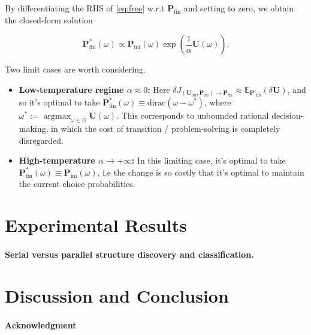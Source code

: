 \documentclass{article} %
\DeclareMathOperator{\argmax}{argmax}
\def\U{\mathbf{U}}
\def\P{\mathbf{P}}
\begin{document}
By differentiating the RHS of \eqref{eq:free} w.r.t $\P_{\text{fin}}$ and setting to zero, we obtain the closed-form solution

\begin{equation}
  \P^*_{\text{fin}}(\omega) \propto \P_{\text{ini}}(\omega)\exp\left(\frac{1}{\alpha}\U(\omega)\right).
\end{equation}

Two limit cases are worth considering.
\begin{itemize}
\item \textbf{Low-temperature regime $\alpha \approx 0$:} Here $\delta J_{(\U_{\text{ini}}, \P_{\text{ini}}) \rightarrow \P_{\text{fin}}} \approx \mathbb E_{\P'_{\text{fin}}}(\delta \U)$, and so it's optimal to take $\P^*_{\text{fin}}(\omega) \equiv \text{dirac}(\omega - \omega^*)$, where $\omega^* := \argmax_{\omega \in \Omega}\U(\omega)$. This corresponds to unbounded rational decision-making, in which the cost of transition / problem-solving is completely disregarded.
  \item \textbf{High-temperature $\alpha \rightarrow +\infty$:} In this limiting case, it's optimal to take $\P^*_{\text{fin}}(\omega) \equiv \P_{\text{ini}}(\omega)$, i.e the change is so costly that it's optimal to maintain the current choice probabilities.
  \end{itemize}
\section{Experimental Results}
\paragraph{Serial versus parallel structure discovery and classification.}


\section{Discussion and Conclusion}



\paragraph{Acknowledgment}

\small


\end{document}
